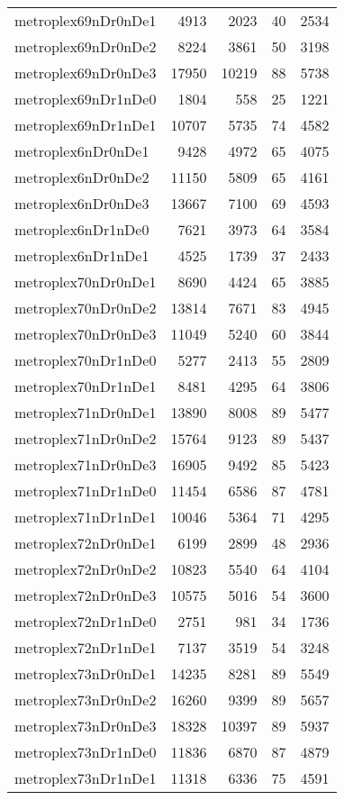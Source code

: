 \begin{longtable}{lrrrr}
metroplex69nDr0nDe1 & 4913 & 2023 & 40 & 2534 \\
metroplex69nDr0nDe2 & 8224 & 3861 & 50 & 3198 \\
metroplex69nDr0nDe3 & 17950 & 10219 & 88 & 5738 \\
metroplex69nDr1nDe0 & 1804 & 558 & 25 & 1221 \\
metroplex69nDr1nDe1 & 10707 & 5735 & 74 & 4582 \\
metroplex6nDr0nDe1 & 9428 & 4972 & 65 & 4075 \\
metroplex6nDr0nDe2 & 11150 & 5809 & 65 & 4161 \\
metroplex6nDr0nDe3 & 13667 & 7100 & 69 & 4593 \\
metroplex6nDr1nDe0 & 7621 & 3973 & 64 & 3584 \\
metroplex6nDr1nDe1 & 4525 & 1739 & 37 & 2433 \\
metroplex70nDr0nDe1 & 8690 & 4424 & 65 & 3885 \\
metroplex70nDr0nDe2 & 13814 & 7671 & 83 & 4945 \\
metroplex70nDr0nDe3 & 11049 & 5240 & 60 & 3844 \\
metroplex70nDr1nDe0 & 5277 & 2413 & 55 & 2809 \\
metroplex70nDr1nDe1 & 8481 & 4295 & 64 & 3806 \\
metroplex71nDr0nDe1 & 13890 & 8008 & 89 & 5477 \\
metroplex71nDr0nDe2 & 15764 & 9123 & 89 & 5437 \\
metroplex71nDr0nDe3 & 16905 & 9492 & 85 & 5423 \\
metroplex71nDr1nDe0 & 11454 & 6586 & 87 & 4781 \\
metroplex71nDr1nDe1 & 10046 & 5364 & 71 & 4295 \\
metroplex72nDr0nDe1 & 6199 & 2899 & 48 & 2936 \\
metroplex72nDr0nDe2 & 10823 & 5540 & 64 & 4104 \\
metroplex72nDr0nDe3 & 10575 & 5016 & 54 & 3600 \\
metroplex72nDr1nDe0 & 2751 & 981 & 34 & 1736 \\
metroplex72nDr1nDe1 & 7137 & 3519 & 54 & 3248 \\
metroplex73nDr0nDe1 & 14235 & 8281 & 89 & 5549 \\
metroplex73nDr0nDe2 & 16260 & 9399 & 89 & 5657 \\
metroplex73nDr0nDe3 & 18328 & 10397 & 89 & 5937 \\
metroplex73nDr1nDe0 & 11836 & 6870 & 87 & 4879 \\
metroplex73nDr1nDe1 & 11318 & 6336 & 75 & 4591 \\

\end{longtable}
